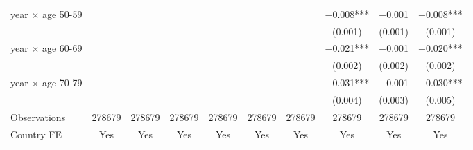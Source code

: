 \begin{tabular}[t]{lccccccccc}
year $\times$ age 50-59 &  &  &  &  &  &  & \num{-0.008}*** & \num{-0.001} & \num{-0.008}***\\
 &  &  &  &  &  &  & (\num{0.001}) & (\num{0.001}) & (\num{0.001})\\
year $\times$ age 60-69 &  &  &  &  &  &  & \num{-0.021}*** & \num{-0.001} & \num{-0.020}***\\
 &  &  &  &  &  &  & (\num{0.002}) & (\num{0.002}) & (\num{0.002})\\
year $\times$ age 70-79 &  &  &  &  &  &  & \num{-0.031}*** & \num{-0.001} & \num{-0.030}***\\
 &  &  &  &  &  &  & (\num{0.004}) & (\num{0.003}) & (\num{0.005})\\
\midrule
Observations & \num{278679} & \num{278679} & \num{278679} & \num{278679} & \num{278679} & \num{278679} & \num{278679} & \num{278679} & \num{278679}\\
Country FE & Yes & Yes & Yes & Yes & Yes & Yes & Yes & Yes & Yes\\
\bottomrule
\end{tabular}
